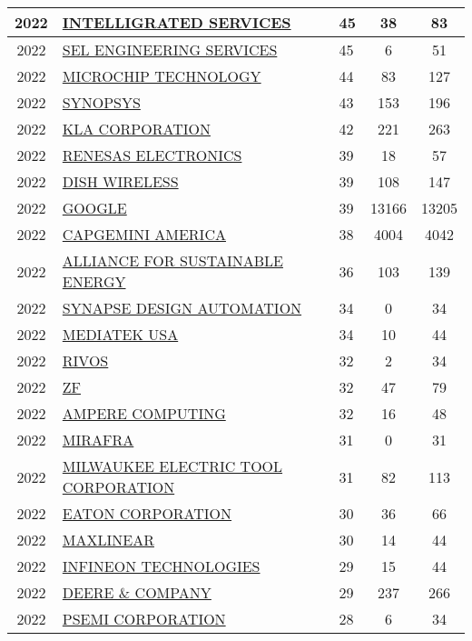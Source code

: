 \documentclass{article}%
\begin{document}
\begin{longtable}{c|p{20em}|p{5em}|c|c}
\hline%
2022&\hyperref[subsec:INTELLIGRATEDSERVICES]{INTELLIGRATED SERVICES}&45&38&83\\%
\hline%
2022&\hyperref[subsec:SELENGINEERINGSERVICES]{SEL ENGINEERING SERVICES}&45&6&51\\%
\hline%
2022&\hyperref[subsec:MICROCHIPTECHNOLOGY]{MICROCHIP TECHNOLOGY}&44&83&127\\%
\hline%
2022&\hyperref[subsec:SYNOPSYS]{SYNOPSYS}&43&153&196\\%
\hline%
2022&\hyperref[subsec:KLACORPORATION]{KLA CORPORATION}&42&221&263\\%
\hline%
2022&\hyperref[subsec:RENESASELECTRONICS]{RENESAS ELECTRONICS}&39&18&57\\%
\hline%
2022&\hyperref[subsec:DISHWIRELESS]{DISH WIRELESS}&39&108&147\\%
\hline%
2022&\hyperref[subsec:GOOGLE]{GOOGLE}&39&13166&13205\\%
\hline%
2022&\hyperref[subsec:CAPGEMINIAMERICA]{CAPGEMINI AMERICA}&38&4004&4042\\%
\hline%
2022&\hyperref[subsec:ALLIANCEFORSUSTAINABLEENERGY]{ALLIANCE FOR SUSTAINABLE ENERGY}&36&103&139\\%
\hline%
2022&\hyperref[subsec:SYNAPSEDESIGNAUTOMATION]{SYNAPSE DESIGN AUTOMATION}&34&0&34\\%
\hline%
2022&\hyperref[subsec:MEDIATEKUSA]{MEDIATEK USA}&34&10&44\\%
\hline%
2022&\hyperref[subsec:RIVOS]{RIVOS}&32&2&34\\%
\hline%
2022&\hyperref[subsec:ZF]{ZF}&32&47&79\\%
\hline%
2022&\hyperref[subsec:AMPERECOMPUTING]{AMPERE COMPUTING}&32&16&48\\%
\hline%
2022&\hyperref[subsec:MIRAFRA]{MIRAFRA}&31&0&31\\%
\hline%
2022&\hyperref[subsec:MILWAUKEEELECTRICTOOLCORPORATION]{MILWAUKEE ELECTRIC TOOL CORPORATION}&31&82&113\\%
\hline%
2022&\hyperref[subsec:EATONCORPORATION]{EATON CORPORATION}&30&36&66\\%
\hline%
2022&\hyperref[subsec:MAXLINEAR]{MAXLINEAR}&30&14&44\\%
\hline%
2022&\hyperref[subsec:INFINEONTECHNOLOGIES]{INFINEON TECHNOLOGIES}&29&15&44\\%
\hline%
2022&\hyperref[subsec:DEERECOMPANY]{DEERE \& COMPANY}&29&237&266\\%
\hline%
2022&\hyperref[subsec:PSEMICORPORATION]{PSEMI CORPORATION}&28&6&34\\%
\hline%

\end{longtable}
\end{document}

